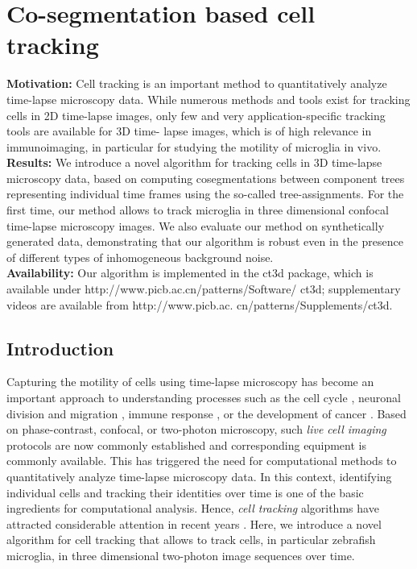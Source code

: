 \chapter{Co-segmentation based cell tracking} \label{chpt:coseg}

\textbf{Motivation:} Cell tracking is an important method to quantitatively analyze time-lapse microscopy data. While numerous methods and tools exist for tracking cells in 2D time-lapse images, only few and very application-specific tracking tools are available for 3D time- lapse images, which is of high relevance in immunoimaging, in particular for studying the motility of microglia in vivo.\\
\textbf{Results:} We introduce a novel algorithm for tracking cells in 3D time-lapse microscopy data, based on computing cosegmentations between component trees representing individual time frames using the so-called tree-assignments. For the first time, our method allows to track microglia in three dimensional confocal time-lapse microscopy images. We also evaluate our method on synthetically generated data, demonstrating that our algorithm is robust even in the presence of different types of inhomogeneous background noise.\\
\textbf{Availability:} Our algorithm is implemented in the ct3d package, which is available under http://www.picb.ac.cn/patterns/Software/ ct3d; supplementary videos are available from http://www.picb.ac. cn/patterns/Supplements/ct3d.

\section{Introduction}

Capturing the motility of cells using time-lapse microscopy has become
an important approach to understanding processes such as the cell
cycle \cite{Harder:09}, neuronal division and migration
\cite{Norden:09}, immune response \cite{Cahalan:08}, or the
development of cancer \cite{Ianzini:09}. Based on phase-contrast,
confocal, or two-photon microscopy, such \emph{live cell imaging}
protocols are now commonly established and corresponding equipment is
commonly available. This has triggered the need for computational
methods to quantitatively analyze time-lapse microscopy data. In this
context, identifying individual cells and tracking their identities
over time is one of the basic ingredients for computational
analysis. Hence, \emph{cell tracking} algorithms have attracted
considerable attention in recent years
\cite{Meijering:06,Miura:05}. Here, we introduce a novel algorithm
for cell tracking that allows to track cells, in particular zebrafish
microglia, in three dimensional two-photon image sequences over time.

